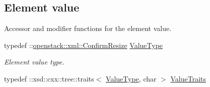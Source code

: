 \subsection*{Element value}
\label{_amgrp2ee2eae1a8c390ea033f241c027da8d6}
Accessor and modifier functions for the element value. \begin{DoxyCompactItemize}
\item 
\hypertarget{classopenstack_1_1xml_1_1ConfirmResize___a405c3b5476751b2685fd92ac05eae0b6}{
typedef ::\hyperlink{classopenstack_1_1xml_1_1ConfirmResize}{openstack::xml::ConfirmResize} \hyperlink{classopenstack_1_1xml_1_1ConfirmResize___a405c3b5476751b2685fd92ac05eae0b6}{ValueType}}
\label{classopenstack_1_1xml_1_1ConfirmResize___a405c3b5476751b2685fd92ac05eae0b6}

\begin{DoxyCompactList}\small\item\em Element value type. \item\end{DoxyCompactList}\item 
\hypertarget{classopenstack_1_1xml_1_1ConfirmResize___ae7a6e51cf6d1a7190f9bb075f01aeb30}{
typedef ::xsd::cxx::tree::traits$<$ \hyperlink{classopenstack_1_1xml_1_1ConfirmResize}{ValueType}, char $>$ \hyperlink{classopenstack_1_1xml_1_1ConfirmResize___ae7a6e51cf6d1a7190f9bb075f01aeb30}{ValueTraits}}
\label{classopenstack_1_1xml_1_1ConfirmResize___ae7a6e51cf6d1a7190f9bb075f01aeb30}


\end{DoxyCompactItemize}
